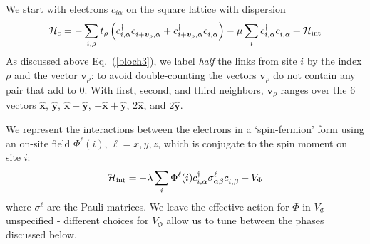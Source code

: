 \documentclass[aps,prb,preprint,onecolumn,citeautoscript,superscriptaddress,footinbib,
eqsecnum]{revtex4-1}
\newcommand{\beq}{\begin{equation}}
\newcommand{\eeq}{\end{equation}}
\begin{document}
We start with electrons $c_{i \alpha}$ on the square lattice with dispersion
\beq
\mathcal{H}_c = - \sum_{i,\rho} t_\rho \left( c_{i , \alpha}^\dagger c_{i + {\bm v}_\rho, \alpha}^{\vphantom \dagger}  + 
c_{i + {\bm v}_\rho, \alpha}^\dagger c_{i, \alpha}^{\vphantom \dagger} \right)  -\mu \sum_{i} c_{i , \alpha}^\dagger c_{i , \alpha}^{\vphantom \dagger}  + \mathcal{H}_{\rm int} \label{Hc}
\eeq
 As discussed above Eq.~(\ref{bloch3}), we label {\it half} the links from site $i$ by the index $\rho$ and the vector ${\bm v}_\rho$: to avoid double-counting the vectors ${\bm v}_\rho$
 do not contain any pair that add to 0. With first, second, and third neighbors, ${\bm v}_\rho$ ranges over the 6 vectors
 $\hat{\bm x}$, $\hat{\bm y}$, $\hat{\bm x}+\hat{\bm y}$, $-\hat{\bm x} + \hat{\bm y}$, $2 \hat{\bm x}$, and $2 \hat{\bm y}$.

We represent the interactions between the electrons in a `spin-fermion' form \cite{hertz} 
using an on-site field $\Phi^\ell (i)$, $\ell = x, y, z$, which is conjugate to the spin moment
on site $i$:
\beq
\mathcal{H}_{\rm int} = - \lambda \sum_i \Phi^\ell (i) c_{i , \alpha}^\dagger \sigma^\ell_{\alpha\beta} c_{i , \beta}^{\vphantom \dagger} + V_\Phi \label{Hint}
\eeq
where $\sigma^\ell$ are the Pauli matrices. We leave the effective action for $\Phi$ in $V_\Phi$ unspecified - different choices for $V_\Phi$ allow
us to tune between the phases discussed below.
\end{document}
